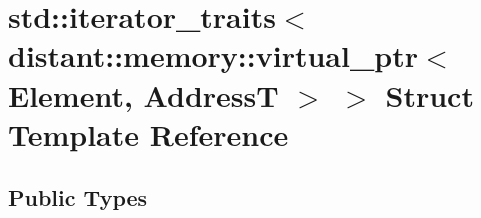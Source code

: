 \hypertarget{structstd_1_1iterator__traits_3_01distant_1_1memory_1_1virtual__ptr_3_01_element_00_01_address_t_01_4_01_4}{}\section{std\+:\+:iterator\+\_\+traits$<$ distant\+:\+:memory\+:\+:virtual\+\_\+ptr$<$ Element, AddressT $>$ $>$ Struct Template Reference}
\label{structstd_1_1iterator__traits_3_01distant_1_1memory_1_1virtual__ptr_3_01_element_00_01_address_t_01_4_01_4}
\subsection*{Public Types}
